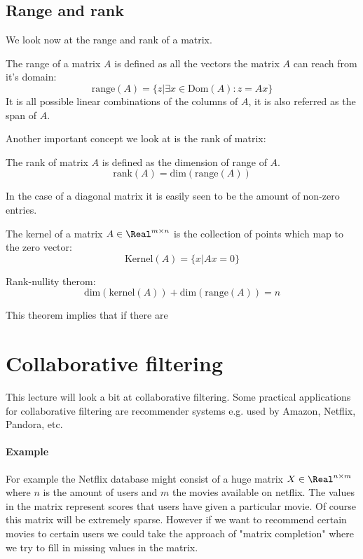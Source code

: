\subsection{Range and rank}
We look now at the range and rank of a matrix.
\begin{defn}
	The range of a matrix $A$ is defined as all the vectors the matrix $A$ can reach from it's domain:
	\begin{equation}
	\text{range}(A) = \{z|\exists x \in \text{Dom}(A) : z = Ax\}
	\end{equation}
	It is all possible linear combinations of the columns of $A$, it is also referred as the span of $A$.
\end{defn}
Another important concept we look at is the rank of matrix:
\begin{defn}
	The rank of matrix $A$ is defined as the dimension of range of $A$. 
	\begin{equation}
	\text{rank}(A) = \text{dim}(\text{range}(A))
	\end{equation}
\end{defn}
In the case of a diagonal matrix it is easily seen to be the amount of non-zero entries.
\begin{defn}
	The kernel of a matrix $A \in \Real^{m\times n}$ is the collection of points which map to the zero vector:
	\begin{equation}
	\text{Kernel}(A) = \{x|Ax=0\}
	\end{equation}
\end{defn}
\begin{thm}
	Rank-nullity therom:
	\begin{equation}
	\text{dim}(\text{kernel}(A)) + \text{dim}(\text{range}(A)) = n
	\end{equation}
\end{thm}
This theorem implies that if there are 
\section{Collaborative filtering}
This lecture will look a bit at collaborative filtering. Some practical applications for collaborative filtering are recommender systems e.g. used by Amazon, Netflix, Pandora, etc.
\paragraph{Example}
For example the Netflix database might consist of a huge matrix $X \in \Real^{n\times m}$ where $n$ is the amount of users and $m$ the movies available on netflix. The values in the matrix represent scores that users have given a particular movie. Of course this matrix will be extremely sparse. However if we want to recommend certain movies to certain users we could take the approach of "matrix completion" where we try to fill in missing values in the matrix.

